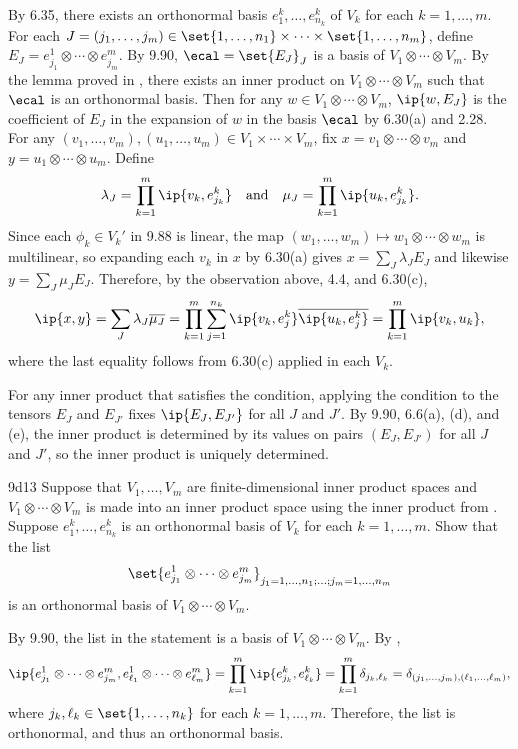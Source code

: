 \begin{sol}
    By 6.35, there exists an orthonormal basis $e_1^k, \ldots, e_{n_k}^k$ of $V_k$ for each $k = 1, \ldots, m$.
    For each $J = (j_1, \ldots, j_m) \in \set{1, \ldots, n_1} \times \cdots \times \set{1, \ldots, n_m}$, define $E_J = e_{j_1}^1 \otimes \cdots \otimes e_{j_m}^m$.
    By 9.90, $\ecal = \set{E_J}_J$ is a basis of $V_1 \otimes \cdots \otimes V_m$.
    By the lemma proved in , there exists an inner product on $V_1 \otimes \cdots \otimes V_m$ such that $\ecal$ is an orthonormal basis.
    Then for any $w \in V_1 \otimes \cdots \otimes V_m$, $\ip{w, E_J}$ is the coefficient of $E_J$ in the expansion of $w$ in the basis $\ecal$ by 6.30(a) and 2.28.
    For any $(v_1, \ldots, v_m), (u_1, \ldots, u_m) \in V_1 \times \cdots \times V_m$, fix $x = v_1 \otimes \cdots \otimes v_m$ and $y = u_1 \otimes \cdots \otimes u_m$.
    Define
    \[
        \lambda_J = \prod_{k=1}^m \ip{v_k, e_{j_k}^k} \quad \text{and} \quad \mu_J = \prod_{k=1}^m \ip{u_k, e_{j_k}^k}.
    \]
    Since each $\phi_k \in V_k'$ in 9.88 is linear, the map $(w_1, \ldots, w_m) \mapsto w_1 \otimes \cdots \otimes w_m$ is multilinear, so expanding each $v_k$ in $x$ by 6.30(a) gives $x = \sum_J \lambda_J E_J$ and likewise $y = \sum_J \mu_J E_J$.
    Therefore, by the observation above, 4.4, and 6.30(c),
    \[
        \ip{x, y} = \sum_J \lambda_J \overline{\mu_J} = \prod_{k=1}^m \sum_{j=1}^{n_k} \ip{v_k, e_j^k} \overline{\ip{u_k, e_j^k}} = \prod_{k=1}^m \ip{v_k, u_k},
    \]
    where the last equality follows from 6.30(c) applied in each $V_k$.
    
    For any inner product that satisfies the condition, applying the condition to the tensors $E_J$ and $E_{J'}$ fixes $\ip{E_J, E_{J'}}$ for all $J$ and $J'$.
    By 9.90, 6.6(a), (d), and (e), the inner product is determined by its values on pairs $(E_J, E_{J'})$ for all $J$ and $J'$, so the inner product is uniquely determined.
\end{sol}

\begin{exercise}{9d13}
    Suppose that $V_1, \ldots, V_m$ are finite-dimensional inner product spaces and $V_1 \otimes \cdots \otimes V_m$ is made into an inner product space using the inner product from .
    Suppose $e^k_1, \ldots, e^k_{n_k}$ is an orthonormal basis of $V_k$ for each $k = 1, \ldots, m$.
    Show that the list
    \[
        \set{e^1_{j_1} \otimes \cdots \otimes e^m_{j_m}}_{j_1 = 1, \ldots, n_1; \ldots; j_m = 1, \ldots, n_m}
    \]
    is an orthonormal basis of $V_1 \otimes \cdots \otimes V_m$.
\end{exercise}

\begin{sol}
    By 9.90, the list in the statement is a basis of $V_1 \otimes \cdots \otimes V_m$.
    By , 
    \[
        \ip{e_{j_1}^1 \otimes \cdots \otimes e_{j_m}^m, e_{\ell_1}^1 \otimes \cdots \otimes e_{\ell_m}^m} = \prod_{k=1}^m \ip{e_{j_k}^k, e_{\ell_k}^k} = \prod_{k=1}^m \delta_{j_k, \ell_k} = \delta_{(j_1, \ldots, j_m), (\ell_1, \ldots, \ell_m)},
    \]
    where $j_k, \ell_k \in \set{1, \ldots, n_k}$ for each $k = 1, \ldots, m$.
    Therefore, the list is orthonormal, and thus an orthonormal basis.
\end{sol}